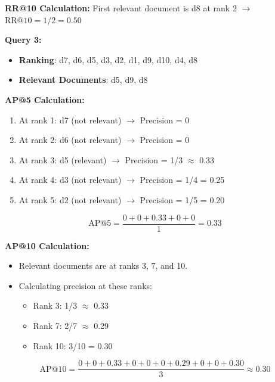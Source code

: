\documentclass[a4paper, utf8]{ctexart}
\begin{document}
	\textbf{RR@10 Calculation:} \quad First relevant document is d8 at rank 2 $\rightarrow$ $\text{RR@10} = 1/2 = 0.50$
	
	\vspace{.5em}
	
	\textbf{Query 3:}
	
	\begin{itemize}[itemsep=2pt, topsep=0pt, parsep=0pt]
	    \item \textbf{Ranking}: d7, d6, d5, d3, d2, d1, d9, d10, d4, d8
	    \item \textbf{Relevant Documents}: d5, d9, d8
	\end{itemize}
	
	\textbf{AP@5 Calculation:}
	
	\begin{enumerate}[itemsep=2pt, topsep=0pt, parsep=0pt]
	    \item At rank 1: d7 (not relevant) $\rightarrow$ Precision = 0
	    \item At rank 2: d6 (not relevant) $\rightarrow$ Precision = 0
	    \item At rank 3: d5 (relevant) $\rightarrow$ Precision = 1/3 $\approx$ 0.33
	    \item At rank 4: d3 (not relevant) $\rightarrow$ Precision = 1/4 = 0.25
	    \item At rank 5: d2 (not relevant) $\rightarrow$ Precision = 1/5 = 0.20
	\end{enumerate}
	
	\begin{equation}
		\text{AP@5} = \frac{0 + 0 + 0.33 + 0 + 0}{1} = 0.33
		\nonumber
	\end{equation}
	
	\textbf{AP@10 Calculation:}
	
	\begin{itemize}[itemsep=2pt, topsep=0pt, parsep=0pt]
		\item Relevant documents are at ranks 3, 7, and 10.
		\item Calculating precision at these ranks:
		\begin{itemize}[itemsep=2pt, topsep=0pt, parsep=0pt]
		    \item Rank 3: 1/3 $\approx$ 0.33
		    \item Rank 7: 2/7 $\approx$ 0.29
		    \item Rank 10: 3/10 = 0.30
		\end{itemize}
	\end{itemize}
	
	\begin{equation}
		\text{AP@10} = \frac{0 + 0 + 0.33 + 0 + 0 + 0 + 0.29 + 0 + 0 + 0.30}{3} \approx 0.30
		\nonumber
	\end{equation}
	
\end{document}
